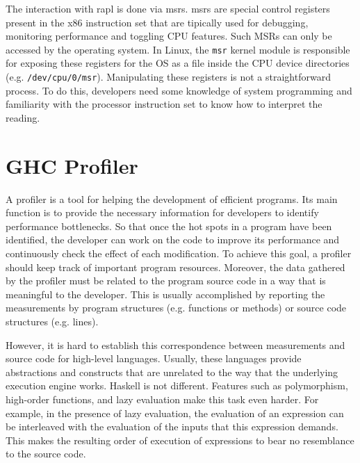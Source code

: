 The interaction with \acs{rapl} is done via \acp{msr}. \acp{msr} are special control registers present in the x86 instruction set that are tipically used for debugging, monitoring performance and toggling CPU features. Such MSRs can only be accessed by the operating system. In Linux, the \texttt{msr} kernel module is responsible for exposing these registers for the OS as a file inside the CPU device directories (e.g. \texttt{/dev/cpu/0/msr}). Manipulating these registers is not a straightforward process. To do this, developers need some knowledge of system programming and familiarity with the processor instruction set to know how to interpret the reading.


\section{GHC Profiler}\label{sec:profiler}
A profiler is a tool for helping the development of efficient programs. Its main function is to provide the necessary information for developers to identify performance bottlenecks. So that once the hot spots in a program have been identified, the developer can work on the code to improve its performance and continuously check the effect of each modification. To achieve this goal, a profiler should keep track of important program resources. Moreover, the data gathered by the profiler must be related to the program source code in a way that is meaningful to the developer. This is usually accomplished by reporting the measurements by program structures (e.g. functions or methods) or source code structures (e.g. lines).

However, it is hard to establish this correspondence between measurements and source code for high-level languages. Usually, these languages provide abstractions and constructs that are unrelated to the way that the underlying execution engine works. Haskell is not different. Features such as polymorphism, high-order functions, and lazy evaluation make this task even harder. For example, in the presence of lazy evaluation, the evaluation of an expression can be interleaved with the evaluation of the inputs that this expression demands. This makes the resulting order of execution of expressions to bear no resemblance to the source code.

